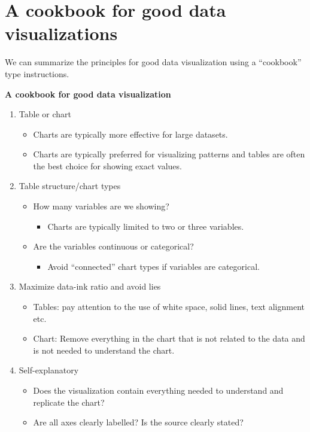 \documentclass[
]{book}
\providecommand{\tightlist}{%
  \setlength{\itemsep}{0pt}\setlength{\parskip}{0pt}}
\begin{document}
\hypertarget{a-cookbook-for-good-data-visualizations}{%
\section{A cookbook for good data visualizations}\label{a-cookbook-for-good-data-visualizations}}

We can summarize the principles for good data visualization using a ``cookbook'' type instructions.

\textbf{A cookbook for good data visualization}

\begin{enumerate}
\def\labelenumi{\arabic{enumi}.}
\item
  Table or chart

  \begin{itemize}
  \tightlist
  \item
    Charts are typically more effective for large datasets.
  \item
    Charts are typically preferred for visualizing patterns and tables are often the best choice for showing exact values.
  \end{itemize}
\item
  Table structure/chart types

  \begin{itemize}
  \tightlist
  \item
    How many variables are we showing?

    \begin{itemize}
    \tightlist
    \item
      Charts are typically limited to two or three variables.
    \end{itemize}
  \item
    Are the variables continuous or categorical?

    \begin{itemize}
    \tightlist
    \item
      Avoid ``connected'' chart types if variables are categorical.
    \end{itemize}
  \end{itemize}
\item
  Maximize data-ink ratio and avoid lies

  \begin{itemize}
  \tightlist
  \item
    Tables: pay attention to the use of white space, solid lines, text alignment etc.
  \item
    Chart: Remove everything in the chart that is not related to the data and is not needed to understand the chart.
  \end{itemize}
\item
  Self-explanatory

  \begin{itemize}
  \tightlist
  \item
    Does the visualization contain everything needed to understand and replicate the chart?
  \item
    Are all axes clearly labelled? Is the source clearly stated?
  \end{itemize}
\end{enumerate}
\end{document}
